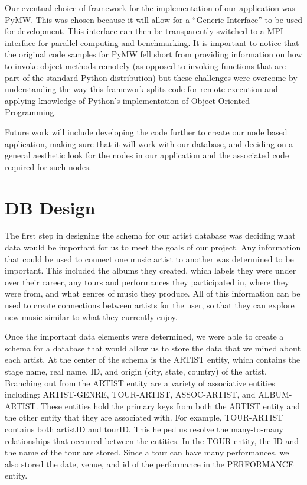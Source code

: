 \documentclass{sig-alternate}
\begin{document}
Our eventual choice of framework for the implementation of our application was PyMW\cite {ieee5161132}. 
This was chosen because it will allow for a ``Generic Interface'' to be used for development. 
This interface can then be transparently switched to a MPI interface for parallel computing and 
benchmarking. It is important to notice that the original code samples for PyMW fell short from
providing information on how to invoke object methods remotely (as opposed to invoking functions
that are part of the standard Python distribution) but these challenges were overcome by
understanding the way this framework splits code for remote execution and applying knowledge
of Python's implementation of Object Oriented Programming.

Future work will include developing the code further to create our node based 
application, making sure that it will work with our database, and deciding on a general 
aesthetic look for the nodes in our application and the associated code required for such nodes. 

\section{DB Design}
\label{db design}

The first step in designing the schema for our artist database was deciding what data would be important
for us to meet the goals of our project. Any information that could be used to connect one music artist 
to another was determined to be important. This included the albums they created, which labels they were 
under over their career, any tours and performances they participated in, where they were from, and what 
genres of music they produce. All of this information can be used to create connections between artists for 
the user, so that they can explore new music similar to what they currently enjoy.

Once the important data elements were determined, we were able to create a schema for a database that would 
allow us to store the data that we mined about each artist. At the center of the schema is the ARTIST entity, 
which contains the stage name, real name, ID, and origin (city, state, country) of the artist. Branching out 
from the ARTIST entity are a variety of associative entities including: ARTIST-GENRE, TOUR-ARTIST, ASSOC-ARTIST, 
and ALBUM-ARTIST. These entities hold the primary keys from both the ARTIST entity and the other entity that 
they are associated with. For example, TOUR-ARTIST contains both artistID and tourID. This helped us resolve 
the many-to-many relationships that occurred between the entities. In the TOUR entity, the ID and the name of 
the tour are stored. Since a tour can have many performances, we also stored the date, venue, and id of the 
performance in the PERFORMANCE entity.
\end{document}
